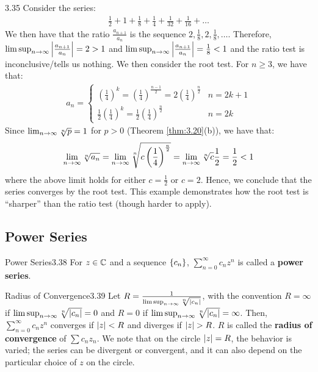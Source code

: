 \begin{example}{}{3.35}
    Consider the series:
    \begin{align*}
        \frac{1}{2} + 1 + \frac{1}{8} + \frac{1}{4} + \frac{1}{32} + \frac{1}{16} + \ldots
    \end{align*}
    We then have that the ratio $\frac{a_{n+1}}{a_n}$ is the sequence $2, \frac{1}{8}, 2, \frac{1}{8}, \ldots$. Therefore, $\limsup_{n \rightarrow \infty} \abs{\frac{a_{n+1}}{a_n}} = 2 > 1$ and $\limsup_{n \rightarrow \infty} \abs{\frac{a_{n+1}}{a_n}} = \frac{1}{8} < 1$ and the ratio test is inconclusive/tells us nothing. We then consider the root test. For $n \geq 3$, we have that:
    \begin{align*}
        a_n = \begin{cases}
            \left(\frac{1}{4}\right)^k = \left(\frac{1}{4}\right)^{\frac{n-1}{2}} = 2\left(\frac{1}{4}\right)^{\frac{n}{2}} & n = 2k + 1
            \\ \frac{1}{2}\left(\frac{1}{4}\right)^{k} = \frac{1}{2}\left(\frac{1}{4}\right)^{\frac{n}{2}} & n = 2k
        \end{cases}
    \end{align*}
    Since $\lim_{n \rightarrow \infty} \sqrt[n]{p} = 1$ for $p > 0$ (Theorem \ref{thm:3.20}(b)), we have that:
    \begin{align*}
        \lim_{n \rightarrow \infty} \sqrt[n]{a_n} = \lim_{n \rightarrow \infty} \sqrt[n]{c\left(\frac{1}{4}\right)^{\frac{n}{2}}} = \lim_{n \rightarrow \infty} \sqrt[n]{c} \frac{1}{2} = \frac{1}{2} < 1
    \end{align*}
    where the above limit holds for either $c = \frac{1}{2}$ or $c = 2$. Hence, we conclude that the series converges by the root test. This example demonstrates how the root test is ``sharper'' than the ratio test (though harder to apply).
\end{example}

\subsection{Power Series}

\setcounter{rudin}{37}
\begin{definition}{Power Series}{3.38}
    For $z \in \mathbb{C}$ and a sequence $\set{c_n}$, $\sum_{n=0}^\infty c_n z^n$ is called a \textbf{power series}.
\end{definition}

\begin{theorem}{Radius of Convergence}{3.39}
    Let $R = \frac{1}{\limsup_{n \rightarrow \infty}\sqrt[n]{\abs{c_n}}}$, with the convention $R = \infty$ if $\limsup_{n \rightarrow \infty}\sqrt[n]{\abs{c_n}} = 0$ and $R = 0$ if $\limsup_{n \rightarrow \infty}\sqrt[n]{\abs{c_n}} = \infty$. Then, $\sum_{n=0}^\infty c_n z^n$ converges if $\abs{z} < R$ and diverges if $\abs{z} > R$. $R$ is called the \textbf{radius of convergence} of $\sum c_n z_n$. We note that on the circle $\abs{z} = R$, the behavior is varied; the series can be divergent or convergent, and it can also depend on the particular choice of $z$ on the circle.
\end{theorem}

